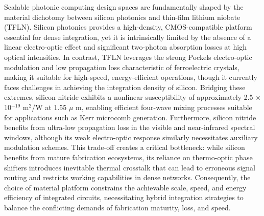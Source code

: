 Scalable photonic computing design spaces are fundamentally shaped by the material dichotomy between silicon photonics and thin-film lithium niobate (TFLN). Silicon photonics provides a high-density, CMOS-compatible platform essential for dense integration, yet it is intrinsically limited by the absence of a linear electro-optic effect and significant two-photon absorption losses at high optical intensities. \citep{doi_10_3390_photonics11040375_bd102ef0} \citep{doi_10_3390_photonics12010005_5e399e5f} In contrast, TFLN leverages the strong Pockels electro-optic modulation and low propagation loss characteristic of ferroelectric crystals, making it suitable for high-speed, energy-efficient operations, though it currently faces challenges in achieving the integration density of silicon. \citep{doi_10_3390_photonics12111129_03f4b6cd} \citep{doi_10_3390_mi17060751_d3932b5d} Bridging these extremes, silicon nitride exhibits a nonlinear susceptibility of approximately 2.5 \(\times\) 10\(^{-19}\) m\(^{2}\)/W at 1.55 \(\mu\) m, enabling efficient four-wave mixing processes suitable for applications such as Kerr microcomb generation. Furthermore, silicon nitride benefits from ultra-low propagation loss in the visible and near-infrared spectral windows, although its weak electro-optic response similarly necessitates auxiliary modulation schemes. This trade-off creates a critical bottleneck: while silicon benefits from mature fabrication ecosystems, its reliance on thermo-optic phase shifters introduces inevitable thermal crosstalk that can lead to erroneous signal routing and restricts working capabilities in dense networks. Consequently, the choice of material platform constrains the achievable scale, speed, and energy efficiency of integrated circuits, necessitating hybrid integration strategies to balance the conflicting demands of fabrication maturity, loss, and speed. \citep{doi_10_48550_arxiv_2209_10098_b3bedb78} \citep{doi_10_1126_science_abj4396_40f36a09} \citep{doi_10_1149_ma2026_01311465mtgabs_643e381a} \citep{doi_10_1109_access_2020_3013116_8fec1fb2}

